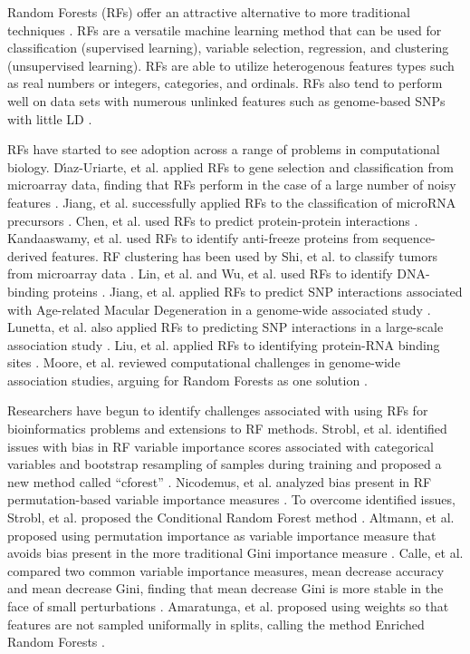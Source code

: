 Random Forests (RFs) offer an attractive alternative to more traditional techniques \cite{Breiman1999}. RFs are a versatile machine learning method that can be used for classification (supervised learning), variable selection, regression, and clustering (unsupervised learning).  RFs are able to utilize heterogenous features types such as real numbers or integers, categories, and ordinals. RFs also tend to perform well on data sets with numerous unlinked features such as genome-based SNPs with little LD \cite{Meng2009}.

RFs have started to see adoption across a range of problems in computational biology.  D\'{\i}az-Uriarte, et al. applied RFs to gene selection and classification from microarray data, finding that RFs perform in the case of a large number of noisy features \cite{Diaz-Uriarte2006}. Jiang, et al. successfully applied RFs to the classification of microRNA precursors \cite{Jiang2007}. Chen, et al. used RFs to predict protein-protein interactions \cite{Chen2005}. Kandaaswamy, et al. used RFs to identify anti-freeze proteins from sequence-derived features. RF clustering has been used by Shi, et al. to classify tumors from microarray data \cite{Shi2005}. Lin, et al. and Wu, et al. used RFs to identify DNA-binding proteins \cite{Lin2011}. Jiang, et al. applied RFs to predict SNP interactions associated with Age-related Macular Degeneration in a genome-wide associated study \cite{Jiang2009}. Lunetta, et al. also applied RFs to predicting SNP interactions in a large-scale association study \cite{Lunetta2004}.  Liu, et al. applied RFs to identifying protein-RNA binding sites \cite{Liu2010}. Moore, et al. reviewed computational challenges in genome-wide association studies, arguing for Random Forests as one solution \cite{Moore2010}.

Researchers have begun to identify challenges associated with using RFs for bioinformatics problems and extensions to RF methods. Strobl, et al. identified issues with bias in RF variable importance scores associated with categorical variables and bootstrap resampling of samples during training and proposed a new method called ``cforest'' \cite{Strobl2007}. Nicodemus, et al. analyzed bias present in RF permutation-based variable importance measures \cite{Nicodemus2010}. To overcome identified issues, Strobl, et al. proposed the Conditional Random Forest method \cite{Strobl2008}. Altmann, et al. proposed using permutation importance as variable importance measure that avoids bias present in the more traditional Gini importance measure \cite{Altmann2010}. Calle, et al. compared two common variable importance measures, mean decrease accuracy and mean decrease Gini, finding that mean decrease Gini is more stable in the face of small perturbations \cite{Calle2011}. Amaratunga, et al. proposed using weights so that features are not sampled uniformally in splits, calling the method Enriched Random Forests \cite{Amaratunga2008}.

